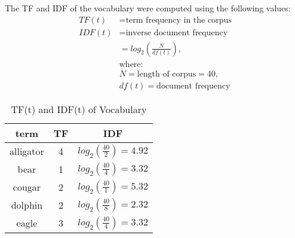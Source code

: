 \documentclass[11pt]{article}
\begin{document}
\begin{enumerate}
        The TF and IDF of the vocabulary were computed using the following values:
        \begin{align*}
            TF(t) &= \text{term frequency in the corpus} \\
            IDF(t) &= \text{inverse document frequency} \\
            &= log_2\left(\frac{N}{df(t)}\right), \\
            &\text{where:} \\
            &N=\text{length of corpus}=40, \\
            &df(t)=\text{document frequency}
        \end{align*}
        {\renewcommand{\arraystretch}{1.5}
        \begin{table}[htbp]
            \begin{center}
                \caption{TF(t) and IDF(t) of Vocabulary}
                \begin{tabular}{| c | c | c |}
                \hline
                \textbf{term} & \textbf{TF} & \textbf{IDF}  \\
                \hline
                alligator   & 4 & $log_2\left(\frac{40}{2}\right)=4.92$ \\
                \hline
                bear        & 1 & $log_2\left(\frac{40}{4}\right)=3.32$ \\
                \hline
                cougar      & 2 & $log_2\left(\frac{40}{1}\right)=5.32$ \\
                \hline
                dolphin     & 2 & $log_2\left(\frac{40}{8}\right)=2.32$ \\
                \hline
                eagle       & 3 & $log_2\left(\frac{40}{4}\right)=3.32$ \\
                \hline
                \end{tabular}
            \end{center}
        \end{table}}


\end{enumerate}
\end{document}
